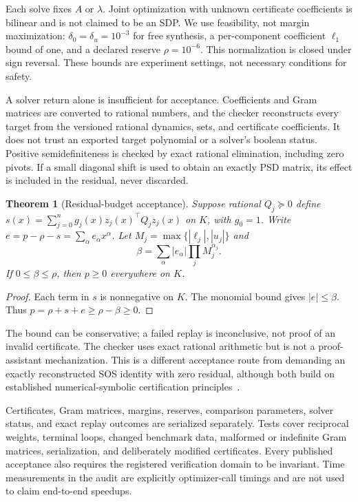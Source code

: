 \documentclass[5p,times]{elsarticle}
\newtheorem{theorem}{Theorem}
\theoremstyle{definition}\newtheorem{definition}[theorem]{Definition}
\theoremstyle{remark}\newtheorem{remark}[theorem]{Remark}
\begin{document}
Each solve fixes $A$ or $\lambda$. Joint optimization with unknown certificate coefficients is bilinear and is not claimed to be an SDP. We use feasibility, not margin maximization: $\delta_0=\delta_u=10^{-3}$ for free synthesis, a per-component coefficient $\ell_1$ bound of one, and a declared reserve $\rho=10^{-6}$. This normalization is closed under sign reversal. These bounds are experiment settings, not necessary conditions for safety.

A solver return alone is insufficient for acceptance. Coefficients and Gram matrices are converted to rational numbers, and the checker reconstructs every target from the versioned rational dynamics, sets, and certificate coefficients. It does not trust an exported target polynomial or a solver's boolean status. Positive semidefiniteness is checked by exact rational elimination, including zero pivots. If a small diagonal shift is used to obtain an exactly PSD matrix, its effect is included in the residual, never discarded.

\begin{theorem}[Residual-budget acceptance]\label{thm:replay}
Suppose rational $Q_j\succeq0$ define $s(x)=\sum_{j=0}^n g_j(x)z_j(x)^\top Q_jz_j(x)$ on $K$, with $g_0=1$. Write $e=p-\rho-s=\sum_\alpha e_\alpha x^\alpha$. Let $M_j=\max\{|\ell_j|,|u_j|\}$ and
\begin{equation}\label{eq:error}
 \beta=\sum_\alpha |e_\alpha|\prod_j M_j^{\alpha_j}.
\end{equation}
If $0\le\beta\le\rho$, then $p\ge0$ everywhere on $K$.
\end{theorem}
\begin{proof}
Each term in $s$ is nonnegative on $K$. The monomial bound gives $|e|\le\beta$. Thus $p=\rho+s+e\ge\rho-\beta\ge0$.
\end{proof}
The bound can be conservative; a failed replay is inconclusive, not proof of an invalid certificate. The checker uses exact rational arithmetic but is not a proof-assistant mechanization. This is a different acceptance route from demanding an exactly reconstructed SOS identity with zero residual, although both build on established numerical-symbolic certification principles~\cite{peyrl}.

Certificates, Gram matrices, margins, reserves, comparison parameters, solver status, and exact replay outcomes are serialized separately. Tests cover reciprocal weights, terminal loops, changed benchmark data, malformed or indefinite Gram matrices, serialization, and deliberately modified certificates. Every published acceptance also requires the registered verification domain to be invariant. Time measurements in the audit are explicitly optimizer-call timings and are not used to claim end-to-end speedups.
\end{document}
